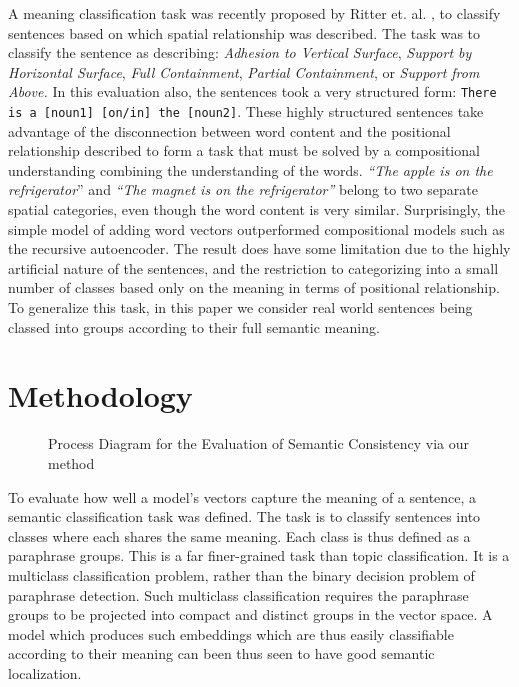\documentclass[]{book}
\begin{document}
A meaning classification task was recently proposed by Ritter et.
al. \cite{RitterPosition}, to classify sentences based on which spatial
relationship was described. The task was to classify the sentence
as describing: \emph{Adhesion to Vertical Surface},\emph{ Support
by Horizontal Surface},\emph{ Full Containment},\emph{ Partial Containment},\emph{
}or\emph{ Support from Above.} In this evaluation also, the sentences
took a very structured form: \texttt{There is a {[}noun1{]} {[}on/in{]}
the {[}noun2{]}}. These highly structured sentences take advantage
of the disconnection between word content and the positional relationship
described to form a task that must be solved by a compositional understanding
combining the understanding of the words. \emph{``The apple is on
the refrigerator}'' and \emph{``The magnet is on the refrigerator''}
belong to two separate spatial categories, even though the word content
is very similar. Surprisingly, the simple model of adding word vectors
outperformed compositional models such as the recursive autoencoder.
The result does have some limitation due to the highly artificial
nature of the sentences, and the restriction to categorizing into
a small number of classes based only on the meaning in terms of positional
relationship. To generalize this task, in this paper we consider real
world sentences being classed into groups according to their full
semantic meaning.


\section{Methodology}

\label{sec:Methodology}

\begin{figure}[t]
{\footnotesize{}}{\footnotesize \par}

\caption{\label{fig:Process-Diagram}Process Diagram for the Evaluation of
Semantic Consistency via our method}
\end{figure}


To evaluate how well a model's vectors capture the meaning of a sentence,
a semantic classification task was defined. The task is to classify
sentences into classes where each shares the same meaning. Each class
is thus defined as a paraphrase groups. This is a far finer-grained
task than topic classification. It is a multiclass classification
problem, rather than the binary decision problem of paraphrase detection.
Such multiclass classification requires the paraphrase groups to be
projected into compact and distinct groups in the vector space. A
model which produces such embeddings which are thus easily classifiable
according to their meaning can been thus seen to have good semantic
localization. 
\end{document}
